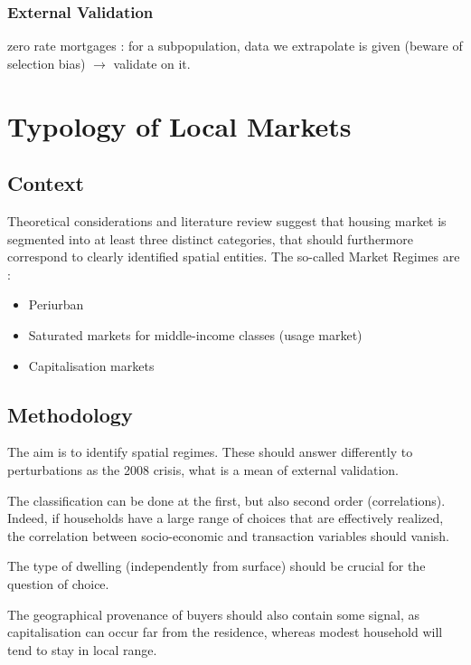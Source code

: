 \subsubsection{External Validation}

zero rate mortgages : for a subpopulation, data we extrapolate is given (beware of selection bias) $\rightarrow$ validate on it.



\section{Typology of Local Markets}


\subsection{Context}

Theoretical considerations and literature review suggest that housing market is segmented into at least three distinct categories, that should furthermore correspond to clearly identified spatial entities. The so-called Market Regimes are :

\begin{itemize}
\item Periurban
\item Saturated markets for middle-income classes (usage market)
\item Capitalisation markets
\end{itemize}


\subsection{Methodology}


The aim is to identify spatial regimes. These should answer differently to perturbations as the 2008 crisis, what is a mean of external validation.

The classification can be done at the first, but also second order (correlations). Indeed, if households have a large range of choices that are effectively realized, the correlation between socio-economic and transaction variables should vanish.

The type of dwelling (independently from surface) should be crucial for the question of choice.

The geographical provenance of buyers should also contain some signal, as capitalisation can occur far from the residence, whereas modest household will tend to stay in local range.


